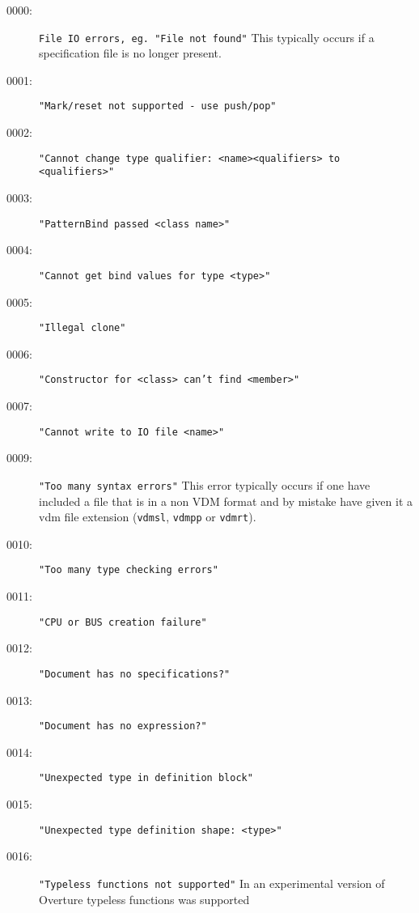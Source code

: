 %
%
%

\begin{description}
\item[0000:] \texttt{File IO errors, eg. "File not found"}  This
  typically occurs if a specification file is no longer present.
\item[0001:] \texttt{"Mark/reset not supported - use push/pop"}
\item[0002:] \texttt{"Cannot change type qualifier:\ <name><qualifiers> to <qualifiers>"}
\item[0003:] \texttt{"PatternBind passed <class name>"}
\item[0004:] \texttt{"Cannot get bind values for type <type>"}
\item[0005:] \texttt{"Illegal clone"}
\item[0006:] \texttt{"Constructor for <class> can't find <member>"}
\item[0007:] \texttt{"Cannot write to IO file <name>"}
\item[0009:] \texttt{"Too many syntax errors"}  This error typically
  occurs if one have included a file that is in a non VDM format and
  by mistake have given it a vdm file extension (\texttt{vdmsl},
  \texttt{vdmpp} or \texttt{vdmrt}).
\item[0010:] \texttt{"Too many type checking errors"}
\item[0011:] \texttt{"CPU or BUS creation failure"}
\item[0012:] \texttt{"Document has no specifications?"}
\item[0013:] \texttt{"Document has no expression?"}
\item[0014:] \texttt{"Unexpected type in definition block"}
\item[0015:] \texttt{"Unexpected type definition shape:\ <type>"}
\item[0016:] \texttt{"Typeless functions not supported"} In an
  experimental version of Overture typeless functions was supported

\end{description}
